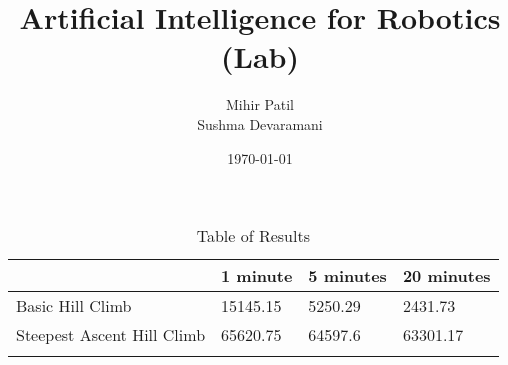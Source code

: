 \documentclass{scrartcl}
\title{Artificial Intelligence for Robotics (Lab)}
\subtitle{\begin{Large}
Assignment 1
\end{Large}}
\date{\today}
\author{Mihir Patil \\ Sushma Devaramani}
\begin{document}
\maketitle
{}

\begin{table}[]
\centering
\caption{Table of Results}
\label{my-label}
\begin{tabular}{llll}
\hline
\multicolumn{1}{|l|}{}                           & \multicolumn{1}{l|}{1 minute} & \multicolumn{1}{l|}{5 minutes} & \multicolumn{1}{l|}{20 minutes} \\ \hline
\multicolumn{1}{|l|}{Basic Hill Climb}           & \multicolumn{1}{l|}{15145.15} & \multicolumn{1}{l|}{5250.29}   & \multicolumn{1}{l|}{2431.73}    \\ \hline
\multicolumn{1}{|l|}{Steepest Ascent Hill Climb} & \multicolumn{1}{l|}{65620.75} & \multicolumn{1}{l|}{64597.6}   & \multicolumn{1}{l|}{63301.17}   \\ \hline
                                                 &                               &                                &                                
\end{tabular}
\end{table}
\end{document}
